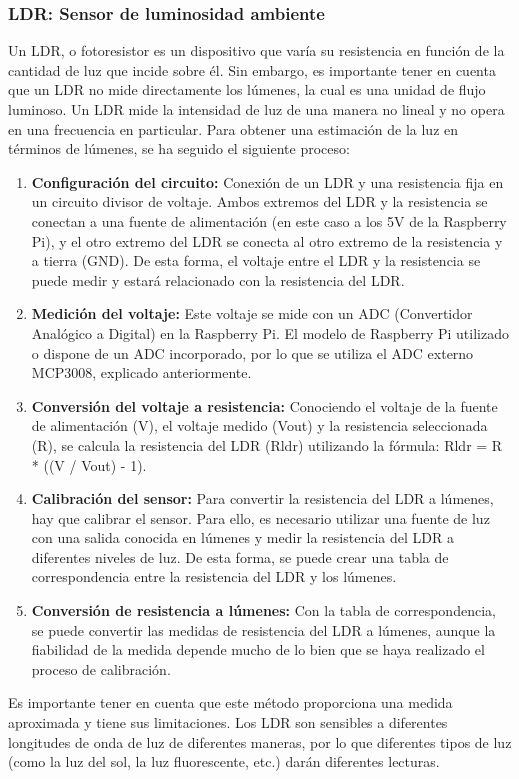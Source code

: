         \subsubsection{LDR: Sensor de luminosidad ambiente}
        Un LDR, o fotoresistor es un dispositivo que varía su resistencia en función de la cantidad de luz que incide sobre él. Sin embargo, es importante tener en cuenta que un LDR no mide directamente los lúmenes, la cual es una unidad de flujo luminoso. Un LDR mide la intensidad de luz de una manera no lineal y no opera en una frecuencia en particular. 
        Para obtener una estimación de la luz en términos de lúmenes, se ha seguido el siguiente proceso:    
        \begin{enumerate}    
            \item \textbf{Configuración del circuito:} 
            Conexión de un LDR y una resistencia fija en un circuito divisor de voltaje. Ambos extremos del LDR y la resistencia se conectan a una fuente de alimentación (en este caso a los 5V de la Raspberry Pi), y el otro extremo del LDR se conecta al otro extremo de la resistencia y a tierra (GND). De esta forma, el voltaje entre el LDR y la resistencia se puede medir y estará relacionado con la resistencia del LDR.   
            \item \textbf{Medición del voltaje:} 
            Este voltaje se mide con un ADC (Convertidor Analógico a Digital) en la Raspberry Pi. El modelo de Raspberry Pi utilizado o dispone de un ADC incorporado, por lo que se utiliza el ADC externo MCP3008, explicado anteriormente.        
            \item \textbf{Conversión del voltaje a resistencia:} 
            Conociendo el voltaje de la fuente de alimentación (V), el voltaje medido (Vout) y la resistencia seleccionada (R), se calcula la resistencia del LDR (Rldr) utilizando la fórmula: Rldr = R * ((V / Vout) - 1).        
            \item \textbf{Calibración del sensor:} 
            Para convertir la resistencia del LDR a lúmenes, hay que calibrar el sensor. Para ello, es necesario utilizar una fuente de luz con una salida conocida en lúmenes y medir la resistencia del LDR a diferentes niveles de luz. De esta forma, se puede crear una tabla de correspondencia entre la resistencia del LDR y los lúmenes.   
            \item \textbf{Conversión de resistencia a lúmenes:} 
            Con la tabla de correspondencia, se puede convertir las medidas de resistencia del LDR a lúmenes, aunque la fiabilidad de la medida depende mucho de lo bien que se haya realizado el proceso de calibración.
        \end{enumerate}        
        Es importante tener en cuenta que este método proporciona una medida aproximada y tiene sus limitaciones. Los LDR son sensibles a diferentes longitudes de onda de luz de diferentes maneras, por lo que diferentes tipos de luz (como la luz del sol, la luz fluorescente, etc.) darán diferentes lecturas.   
